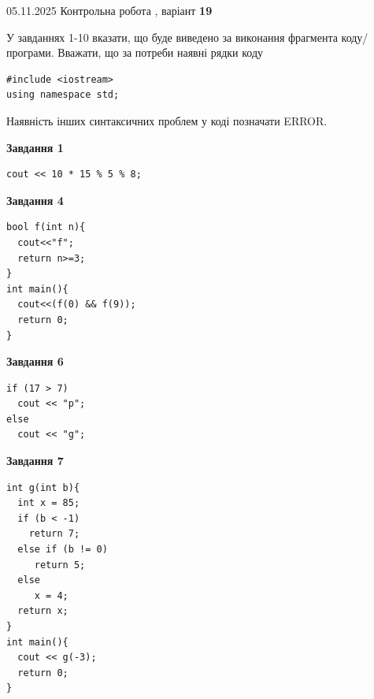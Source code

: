 \documentclass[12pt, ukrainian]{article}
\begin{document}
{\Large{05.11.2025 Контрольна робота , варіант  \No \textbf { 19 }\par}}
{
\begin {large}
У завданнях 1-10 вказати, що буде виведено за виконання фрагмента коду/про\-гра\-ми.
Вважати, що за потреби наявні рядки коду
\begin{verbatim}
#include <iostream>
using namespace std;
\end{verbatim}
Наявність інших синтаксичних проблем у коді позначати ERROR.

\begin{minipage}[t]{7.0cm}

\begin{center}
\textbf{Завдання 1}
\end{center}
\vspace{-8mm}

\begin{verbatim}
cout << 10 * 15 % 5 % 8;
\end{verbatim}



\begin{center}
\textbf{Завдання 4}
\end{center}
\vspace{-8mm}

\begin{verbatim}
bool f(int n){
  cout<<"f";
  return n>=3;
}
int main(){
  cout<<(f(0) && f(9));
  return 0;
}
\end{verbatim}



\begin{center}
\textbf{Завдання 6}
\end{center}
\vspace{-8mm}

\begin{verbatim}
if (17 > 7)
  cout << "p";
else
  cout << "g";
\end{verbatim}



\begin{center}
\textbf{Завдання 7}
\end{center}
\vspace{-8mm}

\begin{verbatim}
int g(int b){
  int x = 85;
  if (b < -1)
    return 7;
  else if (b != 0)
     return 5;
  else
     x = 4;
  return x;
}
int main(){
  cout << g(-3);
  return 0;
}
\end{verbatim}


\end{minipage}
\end{large}}
\end{document}
